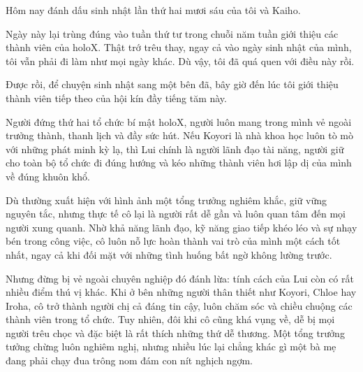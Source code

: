 \documentclass[../main.tex]{subfiles}
\begin{document}
\color{black}



Hôm nay đánh dấu sinh nhật lần thứ hai mươi sáu của tôi và Kaiho.

Ngày này lại trùng đúng vào tuần thứ tư trong chuỗi năm tuần giới thiệu các thành viên của holoX. Thật trớ trêu thay, ngay cả vào ngày sinh nhật của mình, tôi vẫn phải đi làm như mọi ngày khác. Dù vậy, tôi đã quá quen với điều này rồi.

Được rồi, để chuyện sinh nhật sang một bên đã, bây giờ đến lúc tôi giới thiệu thành viên tiếp theo của hội kín đầy tiếng tăm này.

Người đứng thứ hai tổ chức bí mật holoX, người luôn mang trong mình vẻ ngoài trưởng thành, thanh lịch và đầy sức hút. Nếu Koyori là nhà khoa học luôn tò mò với những phát minh kỳ lạ, thì Lui chính là người lãnh đạo tài năng, người giữ cho toàn bộ tổ chức đi đúng hướng và kéo những thành viên hơi lập dị của mình về đúng khuôn khổ.

Dù thường xuất hiện với hình ảnh một tổng trưởng nghiêm khắc, giữ vững nguyên tắc, nhưng thực tế cô lại là người rất dễ gần và luôn quan tâm đến mọi người xung quanh. Nhờ khả năng lãnh đạo, kỹ năng giao tiếp khéo léo và sự nhạy bén trong công việc, cô luôn nỗ lực hoàn thành vai trò của mình một cách tốt nhất, ngay cả khi đối mặt với những tình huống bất ngờ không lường trước.

Nhưng đừng bị vẻ ngoài chuyên nghiệp đó đánh lừa: tính cách của Lui còn có rất nhiều điểm thú vị khác. Khi ở bên những người thân thiết như Koyori, Chloe hay Iroha, cô trở thành người chị cả đáng tin cậy, luôn chăm sóc và chiều chuộng các thành viên trong tổ chức. Tuy nhiên, đôi khi cô cũng khá vụng về, dễ bị mọi người trêu chọc và đặc biệt là rất thích những thứ dễ thương. Một tổng trưởng tưởng chừng luôn nghiêm nghị, nhưng nhiều lúc lại chẳng khác gì một bà mẹ đang phải chạy đua trông nom đám con nít nghịch ngợm.
\end{document}
